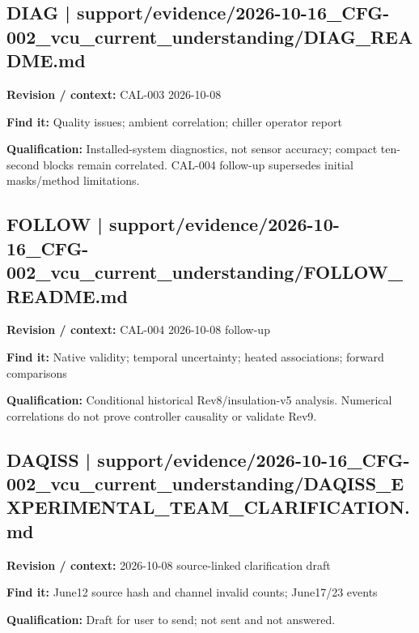 \documentclass[11pt]{article}
\begin{document}
\par\noindent\begin{minipage}{\textwidth}\small
\subsection*{DIAG | support/evidence/2026-10-16\_\allowbreak{}CFG-002\_\allowbreak{}vcu\_\allowbreak{}current\_\allowbreak{}understanding/DIAG\_\allowbreak{}README.md}
\textbf{Revision / context:} CAL-003 2026-10-08\par
\textbf{Find it:} Quality issues; ambient correlation; chiller operator report\par
\textbf{Qualification:} Installed-system diagnostics, not sensor accuracy; compact ten-second blocks remain correlated. CAL-004 follow-up supersedes initial masks/method limitations.\par
\end{minipage}\par\vspace{5pt}
\par\noindent\begin{minipage}{\textwidth}\small
\subsection*{FOLLOW | support/evidence/2026-10-16\_\allowbreak{}CFG-002\_\allowbreak{}vcu\_\allowbreak{}current\_\allowbreak{}understanding/FOLLOW\_\allowbreak{}README.md}
\textbf{Revision / context:} CAL-004 2026-10-08 follow-up\par
\textbf{Find it:} Native validity; temporal uncertainty; heated associations; forward comparisons\par
\textbf{Qualification:} Conditional historical Rev8/insulation-v5 analysis. Numerical correlations do not prove controller causality or validate Rev9.\par
\end{minipage}\par\vspace{5pt}
\par\noindent\begin{minipage}{\textwidth}\small
\subsection*{DAQISS | support/evidence/2026-10-16\_\allowbreak{}CFG-002\_\allowbreak{}vcu\_\allowbreak{}current\_\allowbreak{}understanding/DAQISS\_\allowbreak{}EXPERIMENTAL\_\allowbreak{}TEAM\_\allowbreak{}CLARIFICATION.md}
\textbf{Revision / context:} 2026-10-08 source-linked clarification draft\par
\textbf{Find it:} June12 source hash and channel invalid counts; June17/23 events\par
\textbf{Qualification:} Draft for user to send; not sent and not answered.\par
\end{minipage}\par\vspace{5pt}
\end{document}
